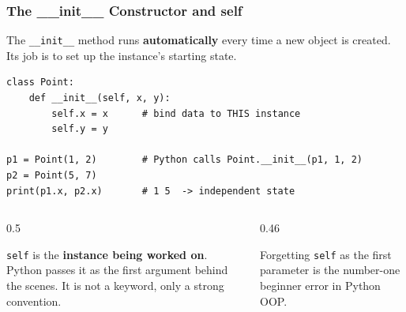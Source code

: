 \documentclass[aspectratio=169,10pt]{beamer}
\newcommand{\keyword}[1]{\textcolor{PrimaryBlue}{\textbf{#1}}}
\newcommand{\codeword}[1]{\texttt{#1}}
\begin{document}
\begin{frame}[fragile]
\frametitle{The \_\_init\_\_ Constructor and self}
\small
The \codeword{\_\_init\_\_} method runs \keyword{automatically} every time a new object is created. Its job is to set up the instance's starting state.

\vspace{0.1cm}
\begin{lstlisting}[style=pycode]
class Point:
    def __init__(self, x, y):
        self.x = x      # bind data to THIS instance
        self.y = y

p1 = Point(1, 2)        # Python calls Point.__init__(p1, 1, 2)
p2 = Point(5, 7)
print(p1.x, p2.x)       # 1 5  -> independent state
\end{lstlisting}

\begin{columns}[T,totalwidth=0.96\textwidth]
\begin{column}{0.5\textwidth}
\begin{tcolorbox}[lecturebox,title=What is self?]
\codeword{self} is the \keyword{instance being worked on}. Python passes it as the first argument behind the scenes. It is not a keyword, only a strong convention.
\end{tcolorbox}
\end{column}
\begin{column}{0.46\textwidth}
\begin{tcolorbox}[lecturebox,title=Common mistake]
Forgetting \codeword{self} as the first parameter is the number-one beginner error in Python OOP.
\end{tcolorbox}
\end{column}
\end{columns}
\end{frame}
\end{document}
